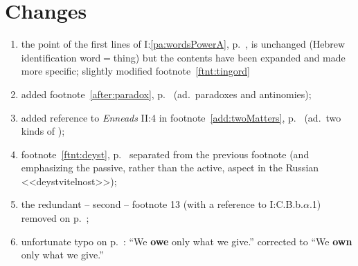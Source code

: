\section*{Changes}
\begin{enumerate}
\item
 the point of the first lines of {I:\para\ref{pa:wordsPowerA}},
 p.~\pageref{pa:wordsPowerA}, is unchanged (Hebrew 
 identification word$=$thing) but the contents have been expanded and made more
 specific; slightly modified footnote~\ref{ftnt:tingord}
\item  
added footnote~\ref{after:paradox}, p.~\pageref{after:paradox} (ad.~paradoxes
and antinomies); 
\item added reference to {\em Enneads} II:4 in footnote~\ref{add:twoMatters},
  p.~\pageref{add:twoMatters} (ad.~two kinds of );
\item footnote~\ref{ftnt:deyst}, p.~\pageref{ftnt:deyst} separated from the
  previous footnote (and emphasizing the passive, rather than the active, aspect
  in the Russian <<deystvitelnost>>);
\item the redundant -- second -- footnote 13 (with a reference to { I:C.B.b.$\alpha$.1})  removed on
  p.~\pageref{sub:moloch}; 
\item unfortunate typo on p.~\pageref{own-give}: ``We {\bf owe} only what we give.''
  corrected to ``We {\bf own} only what we give.''
\end{enumerate}